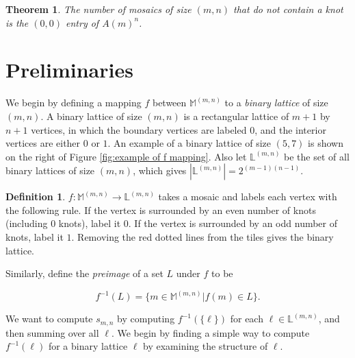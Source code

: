 \documentclass[12pt]{article}
\theoremstyle{plain}
\newtheorem{thm}{Theorem}[section]
\theoremstyle{definition}
\newtheorem{definition}{Definition}[section]
\theoremstyle{remark}
\theoremstyle{definition}
\begin{document}
\begin{thm}
\label{thm: messy mosaics}
The number of mosaics of size $(m,n)$ that \textit{do not} contain a knot is the $(0,0)$ entry of $A(m)^n$.
\end{thm}

\section{Preliminaries}

We begin by defining a mapping $f$ between $\mathbb{M}^{(m,n)}$ to a \textit{binary lattice} of size $(m,n)$. A binary lattice of size $(m,n)$ is a rectangular lattice of $m+1$ by $n+1$ vertices, in which the boundary vertices are labeled $0$, and the interior vertices are either $0$ or $1$. An example of a binary lattice of size $(5,7)$ is shown on the right of Figure \ref{fig:example of f mapping}. Also let $\mathbb{L}^{(m,n)}$ be the set of all binary lattices of size $(m,n)$, which gives $\left|\mathbb{L}^{(m,n)}\right| = 2^{(m-1)(n-1)}$. 

\begin{definition}

$f: \mathbb{M}^{(m,n)} \to \mathbb{L}^{(m,n)}$ takes a mosaic and labels each vertex with the following rule. If the vertex is surrounded by an even number of knots (including $0$ knots), label it $0$. If the vertex is surrounded by an odd number of knots, label it $1$. Removing the red dotted lines from the tiles gives the binary lattice. 
    
\end{definition}

Similarly, define the \textit{preimage} of a set $L$ under $f$ to be

$$f^{-1}(L) = \{m \in \mathbb{M}^{(m,n)} | f(m) \in L\}.$$

We want to compute $s_{m,n}$ by computing $f^{-1}(\{\ell\})$ for each $\ell \in \mathbb{L}^{(m,n)}$, and then summing over all $\ell$. We begin by finding a simple way to compute $f^{-1}(\ell)$ for a binary lattice $\ell$ by examining the structure of $\ell$.
\end{document}
